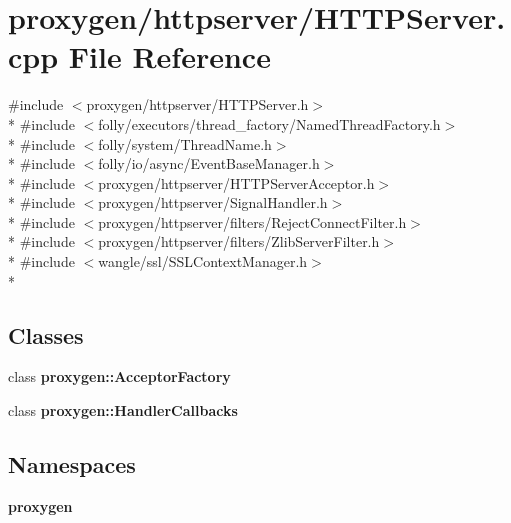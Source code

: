 \section{proxygen/httpserver/\+H\+T\+T\+P\+Server.cpp File Reference}
\label{HTTPServer_8cpp}
{\ttfamily \#include $<$proxygen/httpserver/\+H\+T\+T\+P\+Server.\+h$>$}\\*
{\ttfamily \#include $<$folly/executors/thread\+\_\+factory/\+Named\+Thread\+Factory.\+h$>$}\\*
{\ttfamily \#include $<$folly/system/\+Thread\+Name.\+h$>$}\\*
{\ttfamily \#include $<$folly/io/async/\+Event\+Base\+Manager.\+h$>$}\\*
{\ttfamily \#include $<$proxygen/httpserver/\+H\+T\+T\+P\+Server\+Acceptor.\+h$>$}\\*
{\ttfamily \#include $<$proxygen/httpserver/\+Signal\+Handler.\+h$>$}\\*
{\ttfamily \#include $<$proxygen/httpserver/filters/\+Reject\+Connect\+Filter.\+h$>$}\\*
{\ttfamily \#include $<$proxygen/httpserver/filters/\+Zlib\+Server\+Filter.\+h$>$}\\*
{\ttfamily \#include $<$wangle/ssl/\+S\+S\+L\+Context\+Manager.\+h$>$}\\*
\subsection*{Classes}
\begin{DoxyCompactItemize}
\item 
class {\bf proxygen\+::\+Acceptor\+Factory}
\item 
class {\bf proxygen\+::\+Handler\+Callbacks}
\end{DoxyCompactItemize}
\subsection*{Namespaces}
\begin{DoxyCompactItemize}
\item 
 {\bf proxygen}
\end{DoxyCompactItemize}

